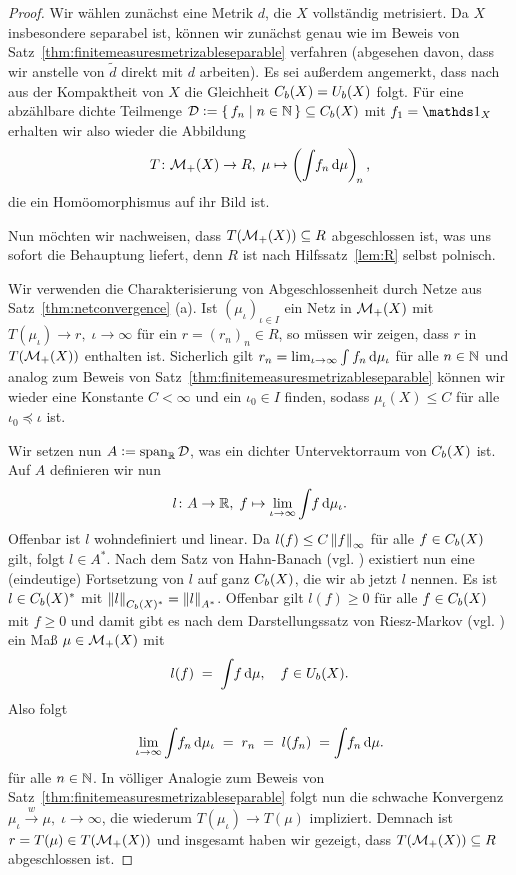 \documentclass[../main/main.tex]{subfiles}
\begin{document}
	\begin{proof}
		Wir wählen zunächst eine Metrik $d$, die $X$ vollständig metrisiert. Da $X$ insbesondere separabel ist, können wir zunächst genau wie 
		im Beweis von Satz~\ref{thm:finitemeasuresmetrizableseparable} verfahren
		(abgesehen davon, dass wir anstelle von $\tilde{d}$ direkt mit $d$ arbeiten). Es sei außerdem angemerkt, dass nach \cite[Satz 2.3.10]{Simon.2015} aus der Kompaktheit von $X$ die Gleichheit $C_b(X) = U_b(X)$ folgt. Für eine abzählbare dichte Teilmenge 
		$\mathcal{D} \vcentcolon = \left\{\, f_n \; \middle| \; n \in \mathbb{N} \,\right\} \subseteq C_b(X)$ mit $f_1 = \indfct_X$ erhalten wir also wieder die Abbildung
		\[ T \colon \mathcal{M}_{+}(X) \to R, \; \mu \mapsto \left( \int_{} \, f_n \, \mathrm{d}\mu \right)_{\! n}  \text{,} \]
		die ein Homöomorphismus auf ihr Bild ist. 
		
		Nun möchten wir nachweisen, dass $T(\mathcal{M}_{+}(X)) \subseteq R$ abgeschlossen ist, was uns sofort die Behauptung liefert, denn $R$ ist nach Hilfssatz~\ref{lem:R} selbst polnisch.
		
		Wir verwenden die Charakterisierung von Abgeschlossenheit 
		durch Netze aus Satz~\ref{thm:netconvergence} (a). Ist $(\mu_\iota)_{\iota \in I}$ ein Netz in $\mathcal{M}_{+}(X)$ mit $T(\mu_\iota) \to r, \; \iota \to \infty$
		für ein $r = (r_n)_n \in R$, so müssen wir zeigen, dass $r$ in $T(\mathcal{M}_{+}(X))$ enthalten ist. Sicherlich gilt
		$r_n = \lim_{\iota \to \infty} \int_{} \, f_n \, \mathrm{d}\mu_\iota$ für alle $n \in \mathbb{N}$ und analog zum Beweis von Satz~\ref{thm:finitemeasuresmetrizableseparable} 
		können wir wieder eine Konstante $C < \infty$ und ein $\iota_0 \in I$ finden, sodass $\mu_\iota(X) \leq C$ für alle $\iota_0 \preceq \iota$ ist.
		
		Wir setzen nun $A \vcentcolon = \mathrm{span}_{\mathbb{R}} \, \mathcal{D}$, was ein dichter Untervektorraum von $C_b(X)$ ist. Auf $A$ definieren wir nun
		\[ l \colon A \to \mathbb{R}, \; f \mapsto \lim_{\iota \to \infty} \int_{} \, f \, \mathrm{d}\mu_\iota  \text{.} \]
		Offenbar ist $l$ wohndefiniert und linear. Da $l(f) \leq C \left\lVert f\right\rVert_\infty$ für alle $f \in C_b(X)$ gilt, folgt $l \in A^\ast$. Nach dem Satz von Hahn-Banach (vgl. \cite[Folgerung 5.5.2]{Simon.2015})
		existiert nun eine (eindeutige) Fortsetzung von $l$ auf ganz $C_b(X)$, die wir ab jetzt $l$ nennen. Es ist $l \in C_b(X)^\ast$ 
		mit $\left\lVert l\right\rVert_{C_b(X)^\ast} = \left\lVert l\right\rVert_{A^\ast}$. Offenbar gilt $l(f) \geq 0$ für alle $f \in C_b(X)$ mit $f \geq 0$ und damit gibt es 
		nach dem Darstellungssatz von Riesz-Markov (vgl. \cite[Satz 4.8.8]{Simon.2015}) ein Maß $\mu \in \mathcal{M}_{+}(X)$ mit 
		\[ l(f) \; = \; \int_{} \, f \, \mathrm{d}\mu, \quad f \in U_b(X) \text{.} \]
		Also folgt
		\[ \lim_{\iota \to \infty} \int_{} \, f_n \, \mathrm{d}\mu_\iota \; = \; r_n \; = \; l(f_n) \; = \int_{} \, f_n \, \mathrm{d}\mu \text{.} \]
		für alle $n \in \mathbb{N}$. In völliger Analogie zum Beweis von Satz~\ref{thm:finitemeasuresmetrizableseparable} folgt nun die schwache Konvergenz $\mu_\iota \xrightarrow{w} \mu, \; \iota \to \infty$,
		die wiederum $T(\mu_\iota) \to T(\mu)$ impliziert. Demnach ist $r = T(\mu) \in T(\mathcal{M}_{+}(X))$ und insgesamt haben wir gezeigt, dass $T(\mathcal{M}_{+}(X)) \subseteq R$ abgeschlossen ist.
	\end{proof}
\end{document}

